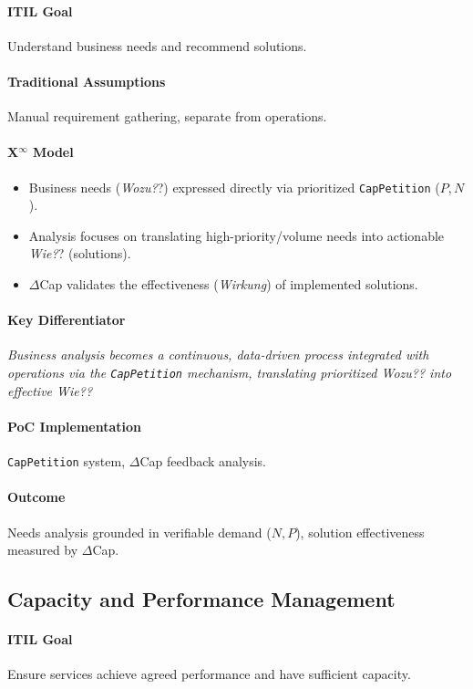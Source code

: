 \documentclass[12pt, a4paper]{scrartcl}
\newcommand{\Xinf}{X$^\infty$}                        %
\newcommand{\DeltaCap}{$\Delta$Cap}                    %
\newcommand{\Wirkung}{\textit{Wirkung}}                 %
\newcommand{\CapPetition}{\texttt{CapPetition}}        %
\newcommand{\Wozu}{\textit{Wozu?}}                      %
\newcommand{\Wie}{\textit{Wie?}}                        %
\begin{document}
\paragraph{ITIL Goal} Understand business needs and recommend solutions.
\paragraph{Traditional Assumptions} Manual requirement gathering, separate from operations.
\paragraph*{\Xinf{} Model}
\begin{itemize}
    \item Business needs (\Wozu?) expressed directly via prioritized \CapPetition{} ($P, N$).
    \item Analysis focuses on translating high-priority/volume needs into actionable \Wie? (solutions).
    \item \DeltaCap{} validates the effectiveness (\Wirkung{}) of implemented solutions.
\end{itemize}
\paragraph{Key Differentiator} \textit{Business analysis becomes a continuous, data-driven process integrated with operations via the \CapPetition{} mechanism, translating prioritized \Wozu? into effective \Wie?}
\paragraph{PoC Implementation} \CapPetition{} system, \DeltaCap{} feedback analysis.
\paragraph{Outcome} Needs analysis grounded in verifiable demand ($N, P$), solution effectiveness measured by \DeltaCap{}.

\subsection{Capacity and Performance Management} %
\paragraph{ITIL Goal} Ensure services achieve agreed performance and have sufficient capacity.
\end{document}
